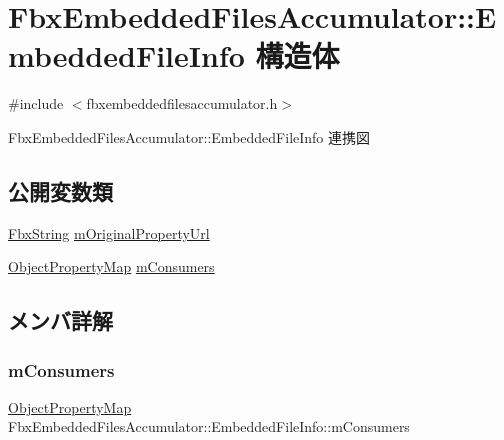 \hypertarget{struct_fbx_embedded_files_accumulator_1_1_embedded_file_info}{}\section{Fbx\+Embedded\+Files\+Accumulator\+:\+:Embedded\+File\+Info 構造体}
\label{struct_fbx_embedded_files_accumulator_1_1_embedded_file_info}


{\ttfamily \#include $<$fbxembeddedfilesaccumulator.\+h$>$}



Fbx\+Embedded\+Files\+Accumulator\+:\+:Embedded\+File\+Info 連携図
\subsection*{公開変数類}
\begin{DoxyCompactItemize}
\item 
\hyperlink{class_fbx_string}{Fbx\+String} \hyperlink{struct_fbx_embedded_files_accumulator_1_1_embedded_file_info_a3a7df7013bc1f2a90a3d1b9cad7b52e1}{m\+Original\+Property\+Url}
\item 
\hyperlink{class_fbx_embedded_files_accumulator_abc919e5ba3486530790dcd7ef90b8eed}{Object\+Property\+Map} \hyperlink{struct_fbx_embedded_files_accumulator_1_1_embedded_file_info_a04b3e7c42f3fe61536e8cc3a13ad682f}{m\+Consumers}
\end{DoxyCompactItemize}


\subsection{メンバ詳解}
\mbox{\label{struct_fbx_embedded_files_accumulator_1_1_embedded_file_info_a04b3e7c42f3fe61536e8cc3a13ad682f}} 
\subsubsection{\texorpdfstring{m\+Consumers}{mConsumers}}
{\footnotesize\ttfamily \hyperlink{class_fbx_embedded_files_accumulator_abc919e5ba3486530790dcd7ef90b8eed}{Object\+Property\+Map} Fbx\+Embedded\+Files\+Accumulator\+::\+Embedded\+File\+Info\+::m\+Consumers}

